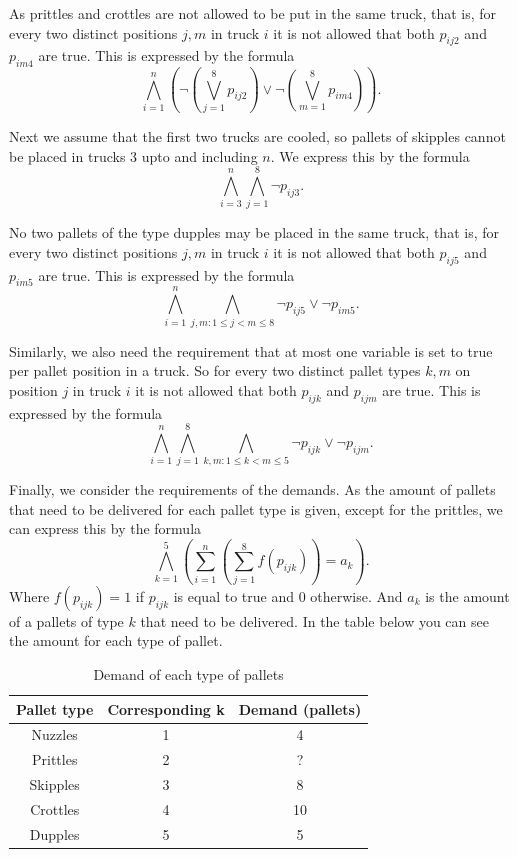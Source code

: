 \documentclass[a4paper]{article}
\begin{document}
	As prittles and crottles are not allowed to be put in the same truck, that is, for every two distinct positions $j,m$ in truck $i$ it is not allowed that both $p_{ij2}$ and $p_{im4}$ are true. This is expressed by the formula
\[ \bigwedge_{i=1}^n (\neg (\bigvee_{j=1}^8 p_{ij2}) \vee \neg (\bigvee_{m=1}^8 p_{im4})).\]

Next we assume that the first two trucks are cooled, so pallets of skipples cannot be placed in trucks 3 upto and including $n$. We express this by the formula
\[ \bigwedge_{i=3}^n \bigwedge_{j=1}^8 \neg p_{ij3}.\]

No two pallets of the type dupples may be placed in the same truck, that is, for every two distinct positions $j,m$ in truck $i$ it is not allowed that both $p_{ij5}$ and $p_{im5}$ are true. This is expressed by the formula
\[ \bigwedge_{i=1}^n \bigwedge_{j,m:1 \leq j < m \leq 8} \neg p_{ij5} \vee \neg p_{im5}.\]

Similarly, we also need the requirement that at most one variable is set to true per pallet position in a truck. So for every two distinct pallet types $k,m$ on position $j$ in truck $i$ it is not allowed that both $p_{ijk}$ and $p_{ijm}$ are true. This is expressed by the formula
\[ \bigwedge_{i=1}^n \bigwedge_{j=1}^8 \bigwedge_{k,m:1 \leq k < m \leq 5} \neg p_{ijk} \vee \neg p_{ijm}.\]

Finally, we consider the requirements of the demands. As the amount of pallets that need to be delivered for each pallet type is given, except for the prittles, we can express this by the formula
\[ \bigwedge_{k=1}^5 ( \sum_{i=1}^n ( \sum_{j=1}^8 f(p_{ijk}) ) = a_k).\]
Where $f(p_{ijk}) = 1$ if $p_{ijk}$ is equal to true and 0 otherwise. And $a_k$ is the amount of a pallets of type $k$ that need to be delivered. In the table below you can see the amount for each type of pallet.

\begin{table}[H]
\centering
\caption{Demand of each type of pallets}
\label{my-label}
\begin{tabular}{c|c|c}
\textbf{Pallet type} & \textbf{Corresponding k} & \textbf{Demand (pallets)} \\ \hline
Nuzzles              & 1                        & 4                  		\\ \hline
Prittles             & 2                        & ?                  		\\ \hline
Skipples             & 3                        & 8                 		\\ \hline
Crottles             & 4                        & 10                 		\\ \hline
Dupples              & 5                        & 5                 
\end{tabular}
\end{table}
\end{document}
